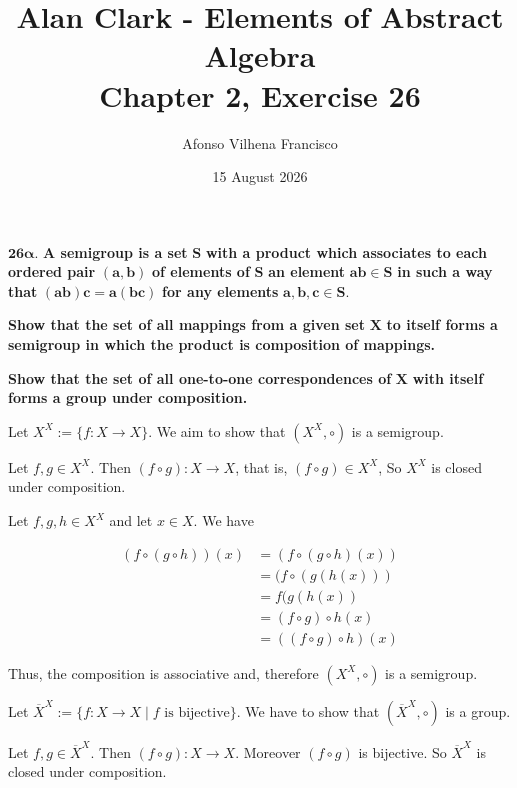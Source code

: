 \documentclass{article}
\title{Alan Clark - Elements of Abstract Algebra\\Chapter 2, Exercise 26\alpha}
\author{Afonso Vilhena Francisco}
\date{15 August 2026}
\begin{document}
\maketitle

 $\mathbf{26 \alpha.}$\textbf{ A semigroup is a set} $\mathbf{S}$ \textbf{with a product which associates to each ordered pair} $\mathbf{(a,b)}$ \textbf{of elements of} $\mathbf{S}$ \textbf{an element} $\mathbf{ab \in S}$ \textbf{in such a way that} $\mathbf{(ab)c=a(bc)}$ \textbf{for any elements} $\mathbf{a,b,c \in S}$.

\textbf{Show that the set of all mappings from a given set} $\mathbf{X}$ \textbf{to itself forms a semigroup in which the product is composition of mappings.}

\textbf{Show that the set of all one-to-one correspondences of } $\mathbf{X}$ \textbf{with itself forms a group under composition.}

\vspace{0.5cm}

Let $X^X:= \{ f:X \rightarrow X \}$. We aim to show that $(X^X, \circ)$ is a semigroup.

Let $f,g \in X^X$. Then $(f \circ g): X\rightarrow X$, that is, $(f \circ g) \in X^X$, So $X^X$ is closed under composition.

Let $f,g,h \in X^X$ and let $x \in X$. We have

\begin{align*}
    (f\circ ( g\circ h))(x) & = (f \circ(g \circ h )(x))\\
                            & = (f \circ (g(h(x)))\\
                            & = f(g(h(x)) \\
                            & = (f \circ g) \circ h(x) \\
                            & = ((f \circ g) \circ h )(x)
\end{align*}

Thus, the composition is associative and, therefore $(X^X, \circ)$ is a semigroup.

\vspace{0.5cm}

Let $\overline{X}^X:=\{ f:X \rightarrow X \mid f \text{ is bijective} \}$. We have to show that $(\overline{X}^X, \circ)$ is a group.

Let $f,g \in \overline{X}^X$. Then $(f \circ g) : X \rightarrow X$. Moreover $(f \circ g)$ is bijective. So $\overline{X}^X$ is closed under composition.
\end{document}
